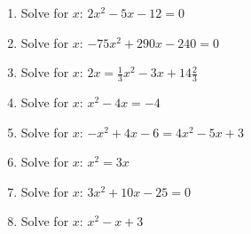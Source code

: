 \begin{enumerate}[noitemsep, label=\textbf{\arabic*}. ]
\label{m39247*uid51}\item Solve for \begin{math}x\end{math}: \begin{math}2{x}^{2}-5x-12=0\end{math}  \hspace{1ex}        
\label{m39247*uid52}\item Solve for \begin{math}x\end{math}: \begin{math}-75{x}^{2}+290x-240=0\end{math}\hspace{1ex}        
\label{m39247*uid53}\item Solve for \begin{math}x\end{math}: \begin{math}2x=\frac{1}{3}{x}^{2}-3x+14\frac{2}{3}\end{math}\hspace{1ex}        
\label{m39247*uid54}\item Solve for \begin{math}x\end{math}: \begin{math}{x}^{2}-4x=-4\end{math}\hspace{1ex}        
\label{m39247*uid55}\item Solve for \begin{math}x\end{math}: \begin{math}-{x}^{2}+4x-6=4{x}^{2}-5x+3\end{math}\hspace{1ex}        
\label{m39247*uid56}\item Solve for \begin{math}x\end{math}: \begin{math}{x}^{2}=3x\end{math}\hspace{1ex}        
\label{m39247*uid57}\item Solve for \begin{math}x\end{math}: \begin{math}3{x}^{2}+10x-25=0\end{math}\hspace{1ex}        
\label{m39247*uid58}\item Solve for \begin{math}x\end{math}: \begin{math}{x}^{2}-x+3\end{math}\hspace{1ex}\hspace{1ex}        

\end{enumerate}
